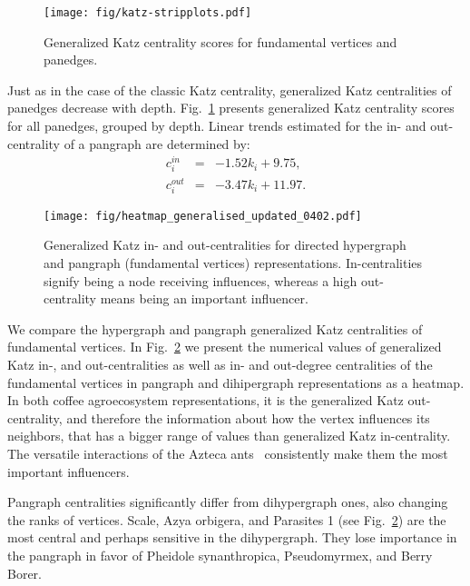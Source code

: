 \documentclass[a4paper,12pt]{article}
\theoremstyle{definition}
\theoremstyle{remark}
\begin{document}
\begin{figure}[h!]
    \centering
    \texttt{[image: fig/katz-stripplots.pdf]}
    \caption{Generalized Katz centrality scores for fundamental vertices and panedges.}
    \label{fig:katz-stripplots}
\end{figure}

Just as in the case of the classic Katz centrality, generalized Katz centralities of panedges decrease with depth. Fig.~\ref{fig:katz-stripplots} presents generalized Katz centrality scores for all panedges, grouped by depth. Linear trends estimated for the in- and out-centrality of a pangraph are determined by:
\begin{eqnarray*}
    c_i^{in} &=& -1.52 k_i + 9.75, \\
    c_i^{out} &=& -3.47 k_i + 11.97.
\end{eqnarray*}
 
\begin{figure}[h!]
    \centering\texttt{[image: fig/heatmap\_generalised\_updated\_0402.pdf]}
    \caption{Generalized Katz in- and out-centralities for directed hypergraph and pangraph (fundamental vertices)
representations. In-centralities signify being a node receiving influences, whereas a high out-centrality means being an important influencer.}
    \label{fig:centralities-heatmap}
\end{figure}

We compare the hypergraph and pangraph generalized Katz centralities of fundamental vertices.  In Fig.~\ref{fig:centralities-heatmap} we present the numerical values of generalized Katz in-, and out-centralities as well as in- and out-degree centralities of the fundamental vertices in pangraph and dihipergraph representations as a heatmap. In both coffee agroecosystem representations, it is the generalized Katz out-centrality, and therefore the information about how the vertex influences its neighbors, that has a bigger range of values than generalized Katz in-centrality. The versatile interactions of the Azteca ants~\cite{Vandermeer_2010, Perfecto_coffe_agroeco} consistently make them the most important influencers.

Pangraph centralities significantly differ from dihypergraph ones, also changing the ranks of vertices. Scale, Azya orbigera, and Parasites 1 (see Fig.~\ref{fig:centralities-heatmap}) are the most central and perhaps sensitive in the dihypergraph. They lose importance in the pangraph in favor of Pheidole synanthropica, Pseudomyrmex, and Berry Borer.
\end{document}
